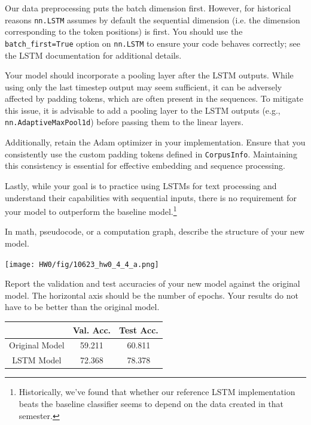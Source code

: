 \documentclass[11pt,addpoints,answers]{exam}
\begin{document}
\begin{questions}
\begin{parts}
Our data preprocessing puts the batch dimension first. However, for historical reasons \lstinline{nn.LSTM} assumes by default the sequential dimension (i.e. the dimension corresponding to the token positions) is first. You should use the \lstinline{batch_first=True} option on \lstinline{nn.LSTM} to ensure your code behaves correctly; see the LSTM documentation for additional details.

Your model should incorporate a pooling layer after the LSTM outputs. While using only the last timestep output may seem sufficient, it can be adversely affected by padding tokens, which are often present in the sequences. To mitigate this issue, it is advisable to add a pooling layer to the LSTM outputs (e.g., \lstinline{nn.AdaptiveMaxPool1d}) before passing them to the linear layers. 

Additionally, retain the Adam optimizer in your implementation. Ensure that you consistently use the custom padding tokens defined in \lstinline{CorpusInfo}. Maintaining this consistency is essential for effective embedding and sequence processing.

Lastly, while your goal is to practice using LSTMs for text processing and understand their capabilities with sequential inputs, there is no requirement for your model to outperform the baseline model.\footnote{Historically, we've found that whether our reference LSTM implementation beats the baseline classifier seems to depend on the data created in that semester.}

\clearpage
\begin{subparts}

    \subpart[2] In math, pseudocode, or a computation graph, describe the structure of your new model.
    \begin{answer_box}[title=,height=7cm, width=15cm]
    \centering
    \texttt{[image: HW0/fig/10623\_hw0\_4\_4\_a.png]}
    \end{answer_box}

    \subpart[4] Report the validation and test accuracies of your new model against the original model. The horizontal axis should be the number of epochs. Your results do not have to be better than the original model.  

    \begin{answer_box}[title=,height=3cm, width=10cm]
    \begin{tabular}{ccc}
        \toprule
        & Val. Acc. & Test Acc. \\
        \midrule
        Original Model & 59.211 & 60.811\\
        LSTM Model & 72.368 & 78.378\\
        \bottomrule
    \end{tabular}
    

\end{answer_box}
\end{subparts}
\end{parts}
\end{questions}
\end{document}
